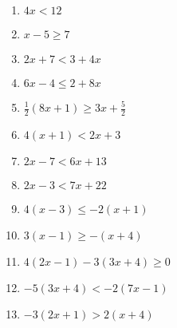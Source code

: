 \documentclass[letterpaper, landscape]{exam}
\begin{document}
  \begin{enumerate}
    \item $4x < 12$

    \item $x - 5 \geq 7$

    \item $2x + 7 < 3 + 4x$

    \item $6x - 4 \leq 2 + 8x$

    \item $\frac{1}{2} (8x + 1) \geq 3x + \frac{5}{2}$

    \item $4(x + 1) < 2x + 3$

    \item $2x - 7 < 6x + 13$

    \item $2x - 3 < 7x + 22$

    \item $4(x - 3) \leq -2(x + 1)$

    \item $3(x - 1) \geq -(x + 4)$

    \item $4(2x - 1) - 3(3x + 4) \geq 0$

    \item $-5(3x + 4) < -2(7x - 1)$

    \item $-3(2x + 1) > 2(x + 4)$

  \end{enumerate}
  
\end{document}
